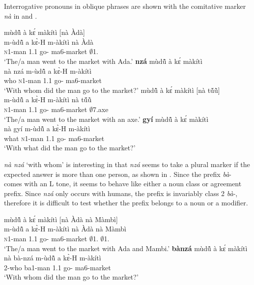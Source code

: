 Interrogative pronouns in oblique phrases are shown with the comitative marker {\itshape nà} in  and .

\ea \label{nanzá}
  \ea  \label{nanzá1}
  \glll    mùdũ̂ à kɛ́ màkítì [nà Àdà] \\
           m-ùdũ̂ a kɛ̀-H m-àkítì {\db}nà Àdà \\
              \textsc{n}1-man 1.{\PST}1 go-{\R} ma6-market {\db}{\COM} $\emptyset$1.{\PN}  \\
    \trans `The/a man went to the market with Ada.'
\ex\label{nanzá2}
  {\bfseries nzá} mùdũ̂ à kɛ́ màkítì  \\
       nà nzá m-ùdũ̂ a kɛ̀-H m-àkítì  \\
           {\COM} who \textsc{n}1-man 1.{\PST}1 go-{\R} ma6-market\\
    \trans `With whom did the man go to the market?'
\z
\ex \label{nagyí}
  \ea  \label{nagyí1}
  \glll    mùdũ̂ à kɛ́ màkítì [nà tṹũ̀]\\
                 m-ùdũ̂ a kɛ̀-H m-àkítì {\db}nà  tṹũ̀ \\
              \textsc{n}1-man 1.{\PST}1 go-{\R} ma6-market {\db}{\COM} $\emptyset$7.axe \\
    \trans `The/a man went to the market with an axe.'
\ex\label{nagyí2}
  {\bfseries gyí} mùdũ̂ à kɛ́ màkítì \\
         nà gyí m-ùdũ̂ a kɛ̀-H m-àkítì  \\
             {\COM} what \textsc{n}1-man 1.{\PST}1 go-{\R} ma6-market \\
    \trans `With what did the man go to the market?'
\z
\z


{\itshape nà nzá} `with whom' is interesting in that {\itshape nzá} seems to take a plural marker if the expected answer is more than one person, as shown in . Since the prefix {\itshape bà}- comes with an L tone, it seems to behave like either a noun class or agreement prefix. Since {\itshape nzá} only occurs with humans, the prefix is invariably class 2 {\itshape bà}-, therefore it is difficult to test whether the prefix belongs to a noun or a modifier.

\ea \label{banzá}
  \ea  \label{banzá1}
  \glll    mùdũ̂ à kɛ́ màkítì [nà Àdà nà Màmbì] \\
           m-ùdũ̂ a kɛ̀-H m-àkítì {\db}nà Àdà nà Màmbì \\
              \textsc{n}1-man 1.{\PST}1 go-{\R} ma6-market {\db}{\COM} $\emptyset$1.{\PN} {\COM} $\emptyset$1.{\PN} \\
    \trans `The/a man went to the market with Ada and Mambi.'
\ex\label{banzá2}
  {\bfseries bànzá} mùdũ̂ à kɛ́ màkítì \\
          nà bà-nzá m-ùdũ̂ a kɛ̀-H m-àkítì \\
           {\COM} 2-who ba1-man 1.{\PST}1 go-{\R} ma6-market\\
    \trans `With whom did the man go to the market?'
\z
\z


